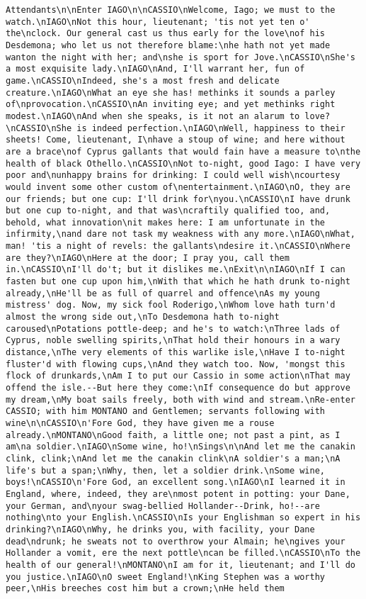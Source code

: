 \begin{verbatim}
Attendants\n\nEnter IAGO\n\nCASSIO\nWelcome, Iago; we must to the watch.\nIAGO\nNot this hour, lieutenant; 'tis not yet ten o' the\nclock. Our general cast us thus early for the love\nof his Desdemona; who let us not therefore blame:\nhe hath not yet made wanton the night with her; and\nshe is sport for Jove.\nCASSIO\nShe's a most exquisite lady.\nIAGO\nAnd, I'll warrant her, fun of game.\nCASSIO\nIndeed, she's a most fresh and delicate creature.\nIAGO\nWhat an eye she has! methinks it sounds a parley of\nprovocation.\nCASSIO\nAn inviting eye; and yet methinks right modest.\nIAGO\nAnd when she speaks, is it not an alarum to love?\nCASSIO\nShe is indeed perfection.\nIAGO\nWell, happiness to their sheets! Come, lieutenant, I\nhave a stoup of wine; and here without are a brace\nof Cyprus gallants that would fain have a measure to\nthe health of black Othello.\nCASSIO\nNot to-night, good Iago: I have very poor and\nunhappy brains for drinking: I could well wish\ncourtesy would invent some other custom of\nentertainment.\nIAGO\nO, they are our friends; but one cup: I'll drink for\nyou.\nCASSIO\nI have drunk but one cup to-night, and that was\ncraftily qualified too, and, behold, what innovation\nit makes here: I am unfortunate in the infirmity,\nand dare not task my weakness with any more.\nIAGO\nWhat, man! 'tis a night of revels: the gallants\ndesire it.\nCASSIO\nWhere are they?\nIAGO\nHere at the door; I pray you, call them in.\nCASSIO\nI'll do't; but it dislikes me.\nExit\n\nIAGO\nIf I can fasten but one cup upon him,\nWith that which he hath drunk to-night already,\nHe'll be as full of quarrel and offence\nAs my young mistress' dog. Now, my sick fool Roderigo,\nWhom love hath turn'd almost the wrong side out,\nTo Desdemona hath to-night caroused\nPotations pottle-deep; and he's to watch:\nThree lads of Cyprus, noble swelling spirits,\nThat hold their honours in a wary distance,\nThe very elements of this warlike isle,\nHave I to-night fluster'd with flowing cups,\nAnd they watch too. Now, 'mongst this flock of drunkards,\nAm I to put our Cassio in some action\nThat may offend the isle.--But here they come:\nIf consequence do but approve my dream,\nMy boat sails freely, both with wind and stream.\nRe-enter CASSIO; with him MONTANO and Gentlemen; servants following with wine\n\nCASSIO\n'Fore God, they have given me a rouse already.\nMONTANO\nGood faith, a little one; not past a pint, as I am\na soldier.\nIAGO\nSome wine, ho!\nSings\n\nAnd let me the canakin clink, clink;\nAnd let me the canakin clink\nA soldier's a man;\nA life's but a span;\nWhy, then, let a soldier drink.\nSome wine, boys!\nCASSIO\n'Fore God, an excellent song.\nIAGO\nI learned it in England, where, indeed, they are\nmost potent in potting: your Dane, your German, and\nyour swag-bellied Hollander--Drink, ho!--are nothing\nto your English.\nCASSIO\nIs your Englishman so expert in his drinking?\nIAGO\nWhy, he drinks you, with facility, your Dane dead\ndrunk; he sweats not to overthrow your Almain; he\ngives your Hollander a vomit, ere the next pottle\ncan be filled.\nCASSIO\nTo the health of our general!\nMONTANO\nI am for it, lieutenant; and I'll do you justice.\nIAGO\nO sweet England!\nKing Stephen was a worthy peer,\nHis breeches cost him but a crown;\nHe held them 
\end{verbatim}
